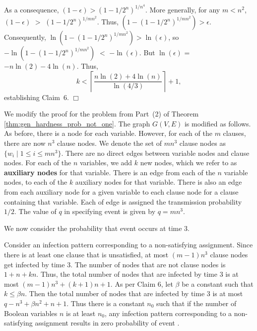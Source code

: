 As a consequence, $(1 - \epsilon) > (1-1/2^n)^{1/{n^4}}$.
More generally, for any $m < n^2$,
$(1 - \epsilon)$ $>$ \mbox{$(1-1/2^n)^{1/{m n^2}}$}.
Thus, $(1- (1-1/2^n)^{1/{m n^2}} ) > \epsilon$.
Consequently, $\ln (1- (1-1/2^n)^{1/{m n^2}} ) > \ln (\epsilon)$,
so \mbox{$- \ln (1- (1-1/2^n)^{1/{m n^2}})$} $<$ $-\ln (\epsilon)$.
But $\ln (\epsilon)$ = $-n \ln (2) - 4  \ln (n)$.
Thus, 
$$k <  \left\lceil \frac{n \ln (2) + 4  \ln (n)}{\ln(4/3)} \right\rceil+ 1,$$
establishing Claim~6. \hfill $\Box$

We modify the proof for the \TwoTotInfv{} problem from 
Part~(2) of Theorem \ref{thm:gen_hardness_prob_not_one}. 
The graph $G(V,E)$ is modified as follows. 
As before, there is a node for each variable.
However, for each of the $m$ clauses,  there are  now $n^3$ clause nodes.
We denote the set of $m n^3$ clause nodes as $\{ w_i \mid 1 \leq i \leq m n^3 \}$.
There are no direct edges between variable nodes and clause nodes.
For each of the $n$ variables, we add $k$ new nodes, 
which we refer to as {\bf auxiliary nodes} for that variable.
There is an edge from each of the $n$ variable nodes, 
to each of the $k$ auxiliary nodes for that variable.
There is also an edge from each auxiliary node for a given variable 
to each clause node for a clause containing that variable.
Each of edge is assigned the transmission probability $1/2$.
The value of $q$ in specifying event \cale{} is 
given by $q = mn^3$.

We now consider the probability that event \cale{} occurs at time 3.

Consider an infection pattern corresponding to a non-satisfying assignment.
Since there is at least one clause that is unsatisfied,
at most $(m-1) n^3$ clause nodes get infected by time 3.
The number of nodes that are not clause nodes is $1 + n +kn$.
Thus, the total number of nodes that are infected by time 3 is at most  $(m-1) n^3 + (k+1) n + 1$.
As per Claim 6, let $\beta$ be a constant such that $k \leq \beta n$.
Then the total number of nodes that are infected by time 3 is at most  $q - n^3 + \beta n^2 + n + 1$.
Thus there is a constant $n_0$ such that if the number of Boolean variables $n$ is at least $n_0$,
any infection pattern corresponding to a non-satisfying assignment 
results in zero probability of event \cale{}.


